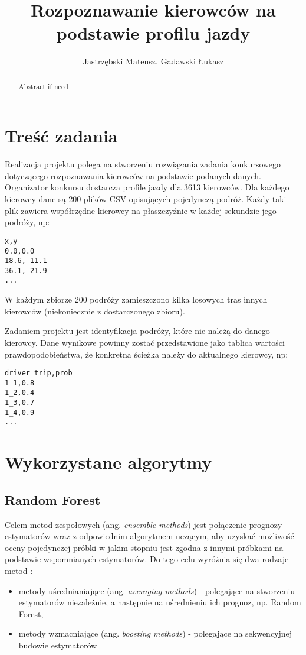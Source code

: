 \documentclass[]{scrartcl}
\title{Rozpoznawanie kierowców na podstawie profilu jazdy}
\author{Jastrzębski Mateusz, Gadawski Łukasz}
\begin{document}
\maketitle

\begin{abstract}
Abstract if need
\end{abstract}

\section{Treść zadania}
Realizacja projektu polega na stworzeniu rozwiązania zadania konkursowego dotyczącego rozpoznawania kierowców na podstawie podanych danych. Organizator konkursu dostarcza profile jazdy dla 3613 kierowców. Dla każdego kierowcy dane są 200 plików CSV opisujących pojedynczą podróż. Każdy taki plik zawiera współrzędne kierowcy na płaszczyźnie w każdej sekundzie jego podróży, np:
\begin{verbatim}
x,y
0.0,0.0
18.6,-11.1
36.1,-21.9
...
\end{verbatim}

W każdym zbiorze 200 podróży zamieszczono kilka losowych tras innych kierowców (niekoniecznie z dostarczonego zbioru).

Zadaniem projektu jest identyfikacja podróży, które nie należą do danego kierowcy. Dane wynikowe powinny zostać przedstawione jako tablica wartości prawdopodobieństwa, że konkretna ścieżka należy do aktualnego kierowcy, np:
\begin{verbatim}
driver_trip,prob
1_1,0.8
1_2,0.4
1_3,0.7
1_4,0.9
...
\end{verbatim}

\section{Wykorzystane algorytmy}
\subsection{Random Forest}
Celem metod zespołowych (ang. \textit{ensemble methods}) jest połączenie prognozy estymatorów wraz z odpowiednim algorytmem uczącym, aby uzyskać możliwość oceny pojedynczej próbki w jakim stopniu jest zgodna z innymi próbkami na podstawie wspomnianych estymatorów. Do tego celu wyróżnia się dwa rodzaje metod 
:
\begin{itemize}
	\item metody uśrednianiające (ang. \textit{averaging methods}) - polegające na stworzeniu estymatorów niezależnie, a następnie na uśrednieniu ich prognoz, np. Random Forest,
	\item metody wzmacniające (ang. \textit{boosting methods}) - polegające na sekwencyjnej budowie estymatorów 
	
\end{itemize}
\end{document}
